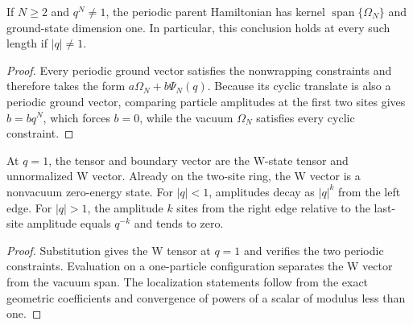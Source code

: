 \begin{lemma}
    \label{thm:pvbs_periodic_parent}
    \leanok
    If $N\ge2$ and $q^N\ne1$, the periodic parent Hamiltonian has kernel
    $\operatorname{span}\{\Omega_N\}$ and ground-state dimension one.
    In particular, this conclusion holds at every such length if $|q|\ne1$.
\end{lemma}
\begin{proof}
    \leanok
    Every periodic ground vector satisfies the nonwrapping constraints and
    therefore takes the form $a\Omega_N+b\Psi_N(q)$. Because its cyclic
    translate is also a periodic ground vector, comparing particle amplitudes
    at the first two sites gives $b=bq^N$, which forces $b=0$, while the
    vacuum $\Omega_N$ satisfies every cyclic constraint.
\end{proof}

\begin{lemma}
    \label{thm:pvbs_boundary_regimes}
    \leanok
    At $q=1$, the tensor and boundary vector are the W-state tensor and
    unnormalized W vector. Already on the two-site ring, the W vector is a
    nonvacuum zero-energy state. For $|q|<1$, amplitudes decay as $|q|^k$
    from the left edge. For $|q|>1$, the amplitude $k$ sites from the right
    edge relative to the last-site amplitude equals $q^{-k}$ and tends to zero.
\end{lemma}
\begin{proof}
    \leanok
    Substitution gives the W tensor at $q=1$ and verifies the two periodic
    constraints. Evaluation on a one-particle configuration separates the
    W vector from the vacuum span. The localization statements follow from
    the exact geometric coefficients and convergence of powers of a scalar
    of modulus less than one.
\end{proof}

